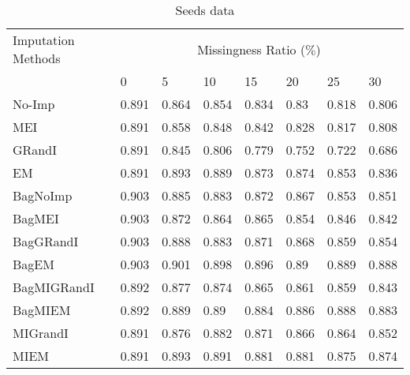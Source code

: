 \documentclass{iosart2c}
\begin{document}
\begin{table*}[htb]
\centering
\caption{Seeds data}
\label{tab:seeds}
    \begin{tabular}{|p{25mm}|l|l|l|l|l|l|l|} \hline
     Imputation Methods    & \multicolumn{7}{c|}{Missingness Ratio ($\%$)} \\ \cline{2-8}
                           &  0 & 5 & 10 & 15 & 20 & 25 & 30 \\ \hline
No-Imp & 0.891 & 0.864 & 0.854 & 0.834 & 0.83 & 0.818 & 0.806 \\ \hline
MEI & 0.891 & 0.858 & 0.848 & 0.842 & 0.828 & 0.817 & 0.808 \\ \hline
GRandI & 0.891 & 0.845 & 0.806 & 0.779 & 0.752 & 0.722 & 0.686 \\ \hline
EM & 0.891 & 0.893 & 0.889 & 0.873 & 0.874 & 0.853 & 0.836 \\ \hline \hline
BagNoImp & 0.903 & 0.885 & 0.883 & 0.872 & 0.867 & 0.853 & 0.851 \\ \hline
BagMEI & 0.903 & 0.872 & 0.864 & 0.865 & 0.854 & 0.846 & 0.842 \\ \hline
BagGRandI & 0.903 & 0.888 & 0.883 & 0.871 & 0.868 & 0.859 & 0.854 \\ \hline
BagEM & 0.903 & 0.901 & 0.898 & 0.896 & 0.89 & 0.889 & 0.888 \\ \hline \hline
BagMIGRandI & 0.892 & 0.877 & 0.874 & 0.865 & 0.861 & 0.859 & 0.843 \\ \hline
BagMIEM & 0.892 & 0.889 & 0.89 & 0.884 & 0.886 & 0.888 & 0.883 \\ \hline \hline
MIGrandI & 0.891 & 0.876 & 0.882 & 0.871 & 0.866 & 0.864 & 0.852 \\ \hline
MIEM & 0.891 & 0.893 & 0.891 & 0.881 & 0.881 & 0.875 & 0.874 \\ \hline
\end{tabular}
\end{table*}
\end{document}
